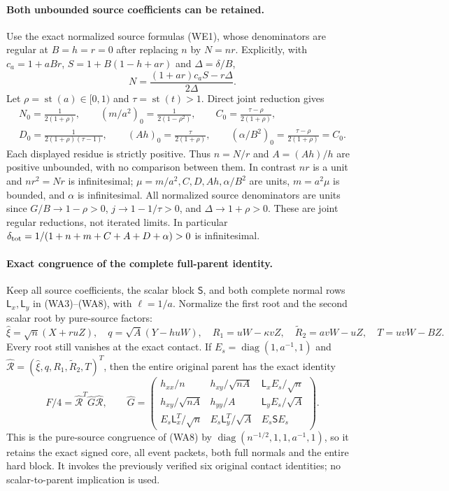 \paragraph{Both unbounded source coefficients can be retained.}
Use the exact normalized source formulas (WE1), whose denominators
are regular at $B=h=r=0$ after replacing $n$ by $N=nr$.
Explicitly, with $c_a=1+aBr$, $S=1+B(1-h+ar)$ and
$\Delta=\delta/B$,
\[
 N=\frac{(1+ar)c_aS-r\Delta}{2\Delta}.
\]
Let $\rho=\operatorname{st}(a)\in[0,1)$ and
$\tau=\operatorname{st}(t)>1$. Direct joint reduction gives
\[
\begin{gathered}
 N_0=\frac1{2(1+\rho)},\qquad
 (m/a^2)_0=\frac1{2(1-\rho^2)},\qquad
 C_0=\frac{\tau-\rho}{2(1+\rho)},\\
 D_0=\frac1{2(1+\rho)(\tau-1)},\qquad
 (Ah)_0=\frac\tau{2(1+\rho)},\qquad
 (\alpha/B^2)_0=\frac{\tau-\rho}{2(1+\rho)}=C_0.    \end{gathered}\tag{SL1}
\]
Each displayed residue is strictly positive. Thus $n=N/r$ and
$A=(Ah)/h$ are positive unbounded, with no comparison between
them. In contrast $nr$ is a unit and $nr^2=Nr$ is infinitesimal;
$\mu=m/a^2,C,D,Ah,\alpha/B^2$ are units, $m=a^2\mu$ is
bounded, and $\alpha$ is infinitesimal.
All normalized source denominators are units since
$G/B\to1-\rho>0$, $j\to1-1/\tau>0$, and
$\Delta\to1+\rho>0$. These are joint regular reductions,
not iterated limits. In particular
$\delta_{\rm tot}=1/(1+n+m+C+A+D+\alpha)>0$ is infinitesimal.

\paragraph{Exact congruence of the complete full-parent identity.}
Keep all source coefficients, the scalar block $\mathsf S$, and
both complete normal rows $\mathsf L_x,\mathsf L_y$ in
(WA3)--(WA8), with $\ell=1/a$. Normalize the first root and
the second scalar root by pure-source factors:
\[
 \widehat\xi=\sqrt n(X+ruZ),\quad
 q=\sqrt A(Y-huW),\quad
 R_1=uW-\kappa vZ,\quad \widetilde R_2=avW-uZ,\quad T=uvW-BZ.
                                                               \tag{SL2}
\]
Every root still vanishes at the exact contact. If
$E_s=\operatorname{diag}(1,a^{-1},1)$ and
$\widehat{\mathcal R}=(\widehat\xi,q,R_1,\widetilde R_2,T)^T$, then
the entire original parent has the exact identity
\[
 F/4=\widehat{\mathcal R}^{T}\widehat G\widehat{\mathcal R},
 \qquad
 \widehat G=
 \begin{pmatrix}
 h_{xx}/n&h_{xy}/\sqrt{nA}&\mathsf L_x E_s/\sqrt n\\
 h_{xy}/\sqrt{nA}&h_{yy}/A&\mathsf L_y E_s/\sqrt A\\
 E_s\mathsf L_x^T/\sqrt n&E_s\mathsf L_y^T/\sqrt A&E_s\mathsf S E_s
 \end{pmatrix}.                                        \tag{SL3}
\]
This is the pure-source congruence of (WA8) by
$\operatorname{diag}(n^{-1/2},1,1,a^{-1},1)$, so it retains
the exact signed core, all event packets, both full normals and
the entire hard block. It invokes the previously verified six
original contact identities; no scalar-to-parent implication is used.

